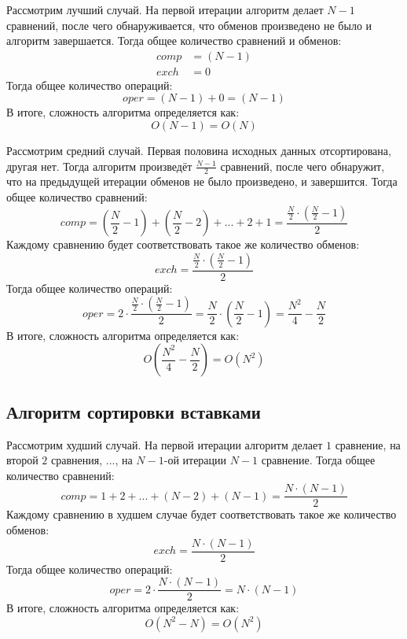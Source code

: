 Рассмотрим лучший случай. На первой итерации алгоритм делает $N-1$ сравнений, после чего обнаруживается, что обменов произведено не было и алгоритм завершается. Тогда общее количество сравнений и обменов:
\begin{align}
	comp &= (N-1) \\
	exch &= 0
\end{align}
Тогда общее количество операций:
\begin{equation}
	oper = (N-1) + 0 = (N-1)
\end{equation}
В итоге, сложность алгоритма определяется как:
\begin{equation}
	O(N-1) = O(N)
\end{equation}

Рассмотрим средний случай. Первая половина исходных данных отсортирована, другая нет. Тогда алгоритм произведёт $\frac{N-1}{2}$ сравнений, после чего обнаружит, что на предыдущей итерации обменов не было произведено, и завершится. Тогда общее количество сравнений:
\begin{equation}
	comp = (\frac{N}{2}-1) + (\frac{N}{2}-2) + ... + 2 + 1 = \frac{\frac{N}{2} \cdot (\frac{N}{2}-1)}{2}
\end{equation}
Каждому сравнению будет соответствовать такое же количество обменов:
\begin{equation}
	exch = \frac{\frac{N}{2} \cdot (\frac{N}{2}-1)}{2}
\end{equation}
Тогда общее количество операций:
\begin{equation}
	oper = 2 \cdot \frac{\frac{N}{2} \cdot (\frac{N}{2}-1)}{2} = \frac{N}{2} \cdot (\frac{N}{2}-1) = \frac{N^2}{4} - \frac{N}{2}
\end{equation}
В итоге, сложность алгоритма определяется как:
\begin{equation}
	O(\frac{N^2}{4} - \frac{N}{2}) = O(N^2)
\end{equation}

\subsection{Алгоритм сортировки вставками}

Рассмотрим худший случай. На первой итерации алгоритм делает $1$ сравнение, на второй $2$ сравнения, ..., на $N-1$-ой итерации $N-1$ сравнение. Тогда общее количество сравнений:
\begin{equation}
	comp = 1 + 2 + ... + (N-2) + (N-1) = \frac{N \cdot (N-1)}{2}
\end{equation}
Каждому сравнению в худшем случае будет соответствовать такое же количество обменов:
\begin{equation}
	exch = \frac{N \cdot (N-1)}{2}
\end{equation}
Тогда общее количество операций:
\begin{equation}
	oper = 2 \cdot \frac{N \cdot (N-1)}{2} = N \cdot (N-1)
\end{equation}
В итоге, сложность алгоритма определяется как:
\begin{equation}
	O(N^2 - N) = O(N^2)
\end{equation}

